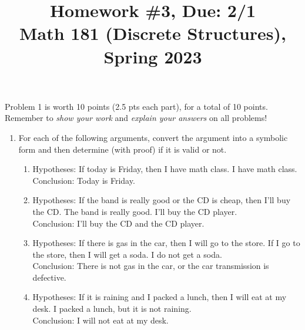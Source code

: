\documentclass[11pt]{article}
\title{Homework \#3, Due: 2/1 \\Math 181 (Discrete Structures), Spring 2023}
\date{}
\begin{document}
\maketitle

\thispagestyle{empty}

\vspace{-1cm}

Problem 1 is worth 10 points (2.5 pts each part), for a total of 10 points. Remember to \emph{show your work} and \emph{explain your answers} on all problems!

\begin{enumerate}
\item For each of the following arguments, convert the argument into a symbolic form and then determine (with proof) if it is valid or not.
\begin{enumerate}
\item Hypotheses: If today is Friday, then I have math class. I have math class. \\ Conclusion: Today is Friday.
\item Hypotheses: If the band is really good or the CD is cheap, then I'll buy the CD. The band is really good. I'll buy the CD player. \\ Conclusion: I'll buy the CD and the CD player.
\item Hypotheses: If there is gas in the car, then I will go to the store. If I go to the store, then I will get a soda. I do not get a soda. \\ Conclusion: There is not gas in the car, or the car transmission is defective.
\item Hypotheses: If it is raining and I packed a lunch, then I will eat at my desk. I packed a lunch, but it is not raining. \\ Conclusion: I will not eat at my desk.
\end{enumerate}
\end{enumerate}
\end{document}
